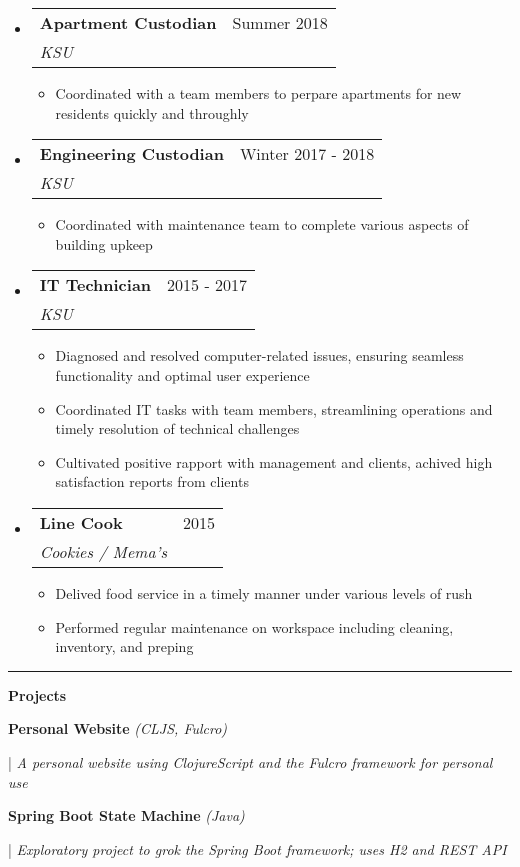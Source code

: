 \documentclass[letterpaper,11pt]{article}
\makeatletter
\newcommand{\resumeItem}[1]{
  \item\small{
    {#1 \vspace{-2pt}}
  }
}
\newcommand{\resumeSubheading}[4]{
  \vspace{-2pt}\item
    \begin{tabular*}{0.97\textwidth}[t]{l@{\extracolsep{\fill}}r}
      \textbf{#1} & #2 \\
      \textit{\small#3} & \textit{\small #4} \\
    \end{tabular*}\vspace{0pt}
}
\newcommand{\resumeSubHeadingListStart}{\begin{itemize}[leftmargin=0.15cm, label={}]}
\newcommand{\resumeSubHeadingListEnd}{\end{itemize}}
\newcommand{\resumeItemListStart}{\begin{itemize}}
\newcommand{\resumeItemListEnd}{\end{itemize}\vspace{-5pt}}
\makeatother
\begin{document}
\resumeSubHeadingListStart
\resumeSubheading
{Apartment Custodian}{Summer 2018}
{KSU}{}
\resumeItemListStart
\resumeItem{ Coordinated with a team members to perpare apartments for new residents quickly and throughly }
\resumeItemListEnd
\resumeSubHeadingListEnd

\newpage

\resumeSubHeadingListStart
\resumeSubheading
{Engineering Custodian}{Winter 2017 - 2018}
{KSU}{}
\resumeItemListStart
\resumeItem{ Coordinated with maintenance team to complete various aspects of building upkeep }
\resumeItemListEnd
\resumeSubHeadingListEnd

\resumeSubHeadingListStart
\resumeSubheading
{IT Technician}{2015 - 2017}
{KSU}{}
\resumeItemListStart
\resumeItem{ Diagnosed and resolved computer-related issues, ensuring seamless functionality and optimal user experience }
\resumeItem{ Coordinated IT tasks with team members, streamlining operations and timely resolution of technical challenges }
\resumeItem{ Cultivated positive rapport with management and clients, achived high satisfaction reports from clients }
\resumeItemListEnd
\resumeSubHeadingListEnd

\resumeSubHeadingListStart
\resumeSubheading
{Line Cook}{2015}
{Cookies / Mema's}{}
\resumeItemListStart
\resumeItem{ Delived food service in a timely manner under various levels of rush }
\resumeItem{ Performed regular maintenance on workspace including cleaning, inventory, and preping }
\resumeItemListEnd
\resumeSubHeadingListEnd


\noindent\rule{19.5cm}{0.4pt}

\textbf{\large \textcolor{magic_blue}{Projects}}


\begin{minipage}[t]{0.28\textwidth}
	\raggedright
	\textbf{ Personal Website }\textit{(CLJS, Fulcro)} \\
\end{minipage}
\hfill
\begin{minipage}[t]{0.70\textwidth}
	\raggedright
	|\textit{ A personal website using ClojureScript and the Fulcro framework for personal use} \\
\end{minipage}

\begin{minipage}[t]{0.28\textwidth}
	\raggedright
	\textbf{ Spring Boot State Machine }\textit{(Java)} \\
\end{minipage}
\hfill
\begin{minipage}[t]{0.70\textwidth}
	\raggedright
	|\textit{ Exploratory project to grok the Spring Boot framework; uses H2 and REST API} \\
\end{minipage}
\end{document}
